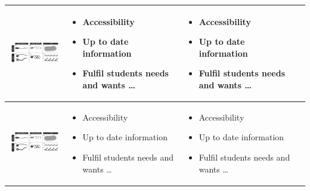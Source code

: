 \documentclass[a4paper,11pt]{article}
\begin{document}
\begin{sloppypar}
\begin{table}[h!]
\begin{tabular}{ c | m{3cm} | m{3cm} | m{3cm} }
 \begin{minipage}{.3\textwidth}
      \includegraphics[width=\linewidth, height=20mm]{cilia}
    \end{minipage}
    &
      \begin{itemize}
        \item Accessibility
        \item Up to date information
        \item Fulfil students needs and wants \ldots
      \end{itemize}
    & 
      \begin{itemize}
        \item Accessibility
        \item Up to date information
        \item Fulfil students needs and wants \ldots
      \end{itemize}
    \\ \hline

 \begin{minipage}{.3\textwidth}
      \includegraphics[width=\linewidth, height=20mm]{cilia}
    \end{minipage}
    &
      \begin{itemize}
        \item Accessibility
        \item Up to date information
        \item Fulfil students needs and wants \ldots
      \end{itemize}
    & 
      \begin{itemize}
        \item Accessibility
        \item Up to date information
        \item Fulfil students needs and wants \ldots
      \end{itemize}
    \\ \hline


\end{tabular}
\end{table}
\end{sloppypar}
\end{document}

